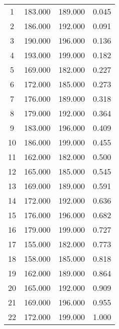 % 
\begin{tabular}{cccc}
  \hline
  \hline
1 & 183.000 & 189.000 & 0.045 \\ 
  2 & 186.000 & 192.000 & 0.091 \\ 
  3 & 190.000 & 196.000 & 0.136 \\ 
  4 & 193.000 & 199.000 & 0.182 \\ 
  5 & 169.000 & 182.000 & 0.227 \\ 
  6 & 172.000 & 185.000 & 0.273 \\ 
  7 & 176.000 & 189.000 & 0.318 \\ 
  8 & 179.000 & 192.000 & 0.364 \\ 
  9 & 183.000 & 196.000 & 0.409 \\ 
  10 & 186.000 & 199.000 & 0.455 \\ 
  11 & 162.000 & 182.000 & 0.500 \\ 
  12 & 165.000 & 185.000 & 0.545 \\ 
  13 & 169.000 & 189.000 & 0.591 \\ 
  14 & 172.000 & 192.000 & 0.636 \\ 
  15 & 176.000 & 196.000 & 0.682 \\ 
  16 & 179.000 & 199.000 & 0.727 \\ 
  17 & 155.000 & 182.000 & 0.773 \\ 
  18 & 158.000 & 185.000 & 0.818 \\ 
  19 & 162.000 & 189.000 & 0.864 \\ 
  20 & 165.000 & 192.000 & 0.909 \\ 
  21 & 169.000 & 196.000 & 0.955 \\ 
  22 & 172.000 & 199.000 & 1.000 \\ 
   \hline
\end{tabular}
